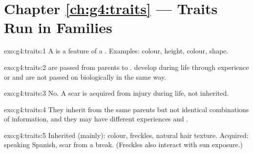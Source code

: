 \section*{Chapter \ref{ch:g4:traits} --- Traits Run in Families}

\begin{solution}{exo:g4:traits:1}
A  is a feature of a . Examples:  colour, height,
 colour,  shape.
\end{solution}

\begin{solution}{exo:g4:traits:2}
 are passed from parents to . 
develop during life through experience or  and are not
passed on biologically in the same way.
\end{solution}

\begin{solution}{exo:g4:traits:3}
No. A scar is acquired from injury during life, not inherited.
\end{solution}

\begin{solution}{exo:g4:traits:4}
They inherit from the same parents but not identical combinations of
information, and they may have different experiences and .
\end{solution}

\begin{solution}{exo:g4:traits:5}
Inherited (mainly):  colour, freckles, natural hair texture.
Acquired: speaking Spanish, scar from a break. (Freckles also interact
with sun exposure.)
\end{solution}

